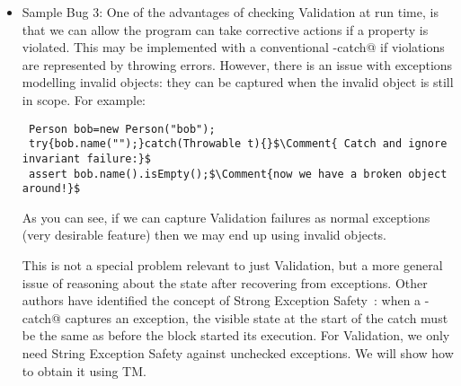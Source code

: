 \begin{itemize}
\item Sample Bug 3:
One of the advantages of checking Validation at run time, is that
we can allow the program can take corrective actions if a property is violated.
This may be implemented with a conventional \Q@try-catch@ if violations are represented by throwing errors.
However, there is an issue with exceptions modelling invalid objects: they can be captured when the invalid object is still in scope. For example:
\saveSpace
\begin{lstlisting}
 Person bob=new Person("bob");
 try{bob.name("");}catch(Throwable t){}$\Comment{ Catch and ignore invariant failure:}$
 assert bob.name().isEmpty();$\Comment{now we have a broken object around!}$
\end{lstlisting}
\saveSpace
As you can see, if we can capture Validation failures as normal exceptions (very desirable feature) then we may end up using invalid objects.

This is not a special problem relevant to just Validation, but a more general issue of reasoning about the state after recovering from exceptions.
Other authors have identified the concept of Strong Exception Safety~\cite{Abrahams2000}:
when a \Q@try-catch@ captures an exception, the visible state at the start of the catch must be the same as before the \Q@try@ block started its execution.
For Validation, we only need String Exception Safety against unchecked exceptions. We will show how to obtain it using TM.
\end{itemize}






